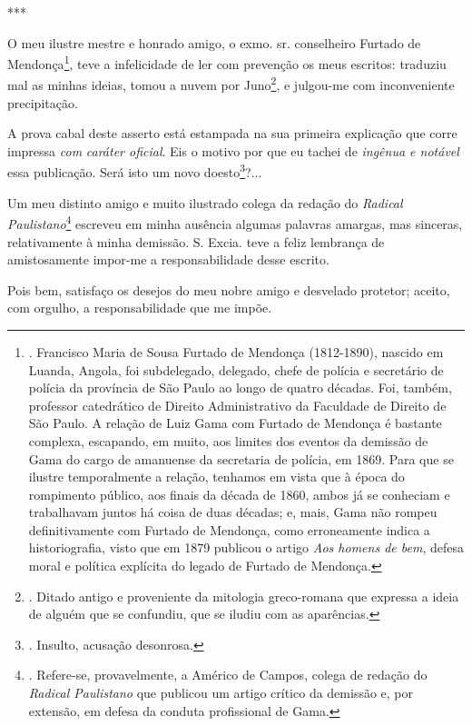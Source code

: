 ***

O meu ilustre mestre e honrado amigo, o exmo. sr. conselheiro Furtado de
Mendonça\footnote{. Francisco Maria de Sousa Furtado de Mendonça
  (1812-1890), nascido em Luanda, Angola, foi subdelegado, delegado,
  chefe de polícia e secretário de polícia da província de São Paulo ao
  longo de quatro décadas. Foi, também, professor catedrático de Direito
  Administrativo da Faculdade de Direito de São Paulo. A relação de Luiz
  Gama com Furtado de Mendonça é bastante complexa, escapando, em muito,
  aos limites dos eventos da demissão de Gama do cargo de amanuense da
  secretaria de polícia, em 1869. Para que se ilustre temporalmente a
  relação, tenhamos em vista que à época do rompimento público, aos
  finais da década de 1860, ambos já se conheciam e trabalhavam juntos
  há coisa de duas décadas; e, mais, Gama não rompeu definitivamente com
  Furtado de Mendonça, como erroneamente indica a historiografia, visto
  que em 1879 publicou o artigo \emph{Aos homens de bem}, defesa moral e
  política explícita do legado de Furtado de Mendonça.}, teve a
infelicidade de ler com prevenção os meus escritos: traduziu mal as
minhas ideias, tomou a nuvem por Juno\footnote{. Ditado antigo e
  proveniente da mitologia greco-romana que expressa a ideia de alguém
  que se confundiu, que se iludiu com as aparências.}, e julgou-me com
inconveniente precipitação.

A prova cabal deste asserto está estampada na sua primeira explicação
que corre impressa \emph{com} \emph{caráter oficial}. Eis o motivo por
que eu tachei de \emph{ingênua e notável} essa publicação. Será isto um
novo doesto\footnote{. Insulto, acusação desonrosa.}?...

Um meu distinto amigo e muito ilustrado colega da redação do
\emph{Radical Paulistano}\footnote{. Refere-se, provavelmente, a Américo
  de Campos, colega de redação do \emph{Radical Paulistano} que publicou
  um artigo crítico da demissão e, por extensão, em defesa da conduta
  profissional de Gama.} escreveu em minha ausência algumas palavras
amargas, mas sinceras, relativamente à minha demissão. S. Excia. teve a
feliz lembrança de amistosamente impor-me a responsabilidade desse
escrito.

Pois bem, satisfaço os desejos do meu nobre amigo e desvelado protetor;
aceito, com orgulho, a responsabilidade que me impõe.

